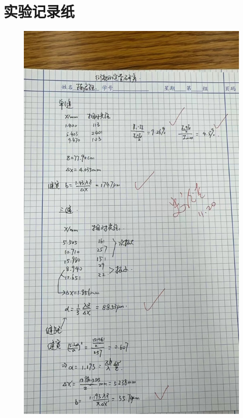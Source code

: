 \documentclass[a4paper]{ctexart}
\begin{document}
	\section{实验记录纸}
	\begin{figure}[H]
		\centering
		\includegraphics[width=13cm]{note.jpg}
	\end{figure}
\end{document}
